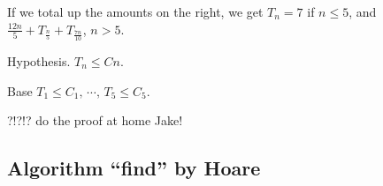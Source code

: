 \documentclass{article}
\begin{document}
If we total up the amounts on the right, we get $T_n = 7$ if $n \leq 5$, and $\frac{12n}{5} + T_{\frac{n}{5}} + T_{\frac{7n}{10}}$, $n > 5$.

Hypothesis. $T_n \leq Cn$.

Base $T_1 \leq C_1,\, \cdots,\, T_5 \leq C_5$.

?!?!? do the proof at home Jake!

\subsection{Algorithm ``find'' by Hoare}
\end{document}
